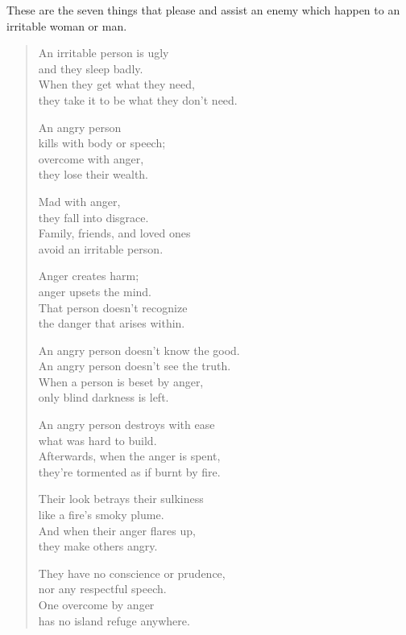 \documentclass[12pt,openany]{book}%
\begin{document}
These are the seven things that please and assist an enemy which happen to an irritable woman or man. 

\begin{verse}%
An irritable person is ugly \\
and they sleep badly. \\
When they get what they need, \\
they take it to be what they don’t need. 

An angry person \\
kills with body or speech; \\
overcome with anger, \\
they lose their wealth. 

Mad with anger, \\
they fall into disgrace. \\
Family, friends, and loved ones \\
avoid an irritable person. 

Anger creates harm; \\
anger upsets the mind. \\
That person doesn’t recognize \\
the danger that arises within. 

An angry person doesn’t know the good. \\
An angry person doesn’t see the truth. \\
When a person is beset by anger, \\
only blind darkness is left. 

An angry person destroys with ease \\
what was hard to build. \\
Afterwards, when the anger is spent, \\
they’re tormented as if burnt by fire. 

Their look betrays their sulkiness \\
like a fire’s smoky plume. \\
And when their anger flares up, \\
they make others angry. 

They have no conscience or prudence, \\
nor any respectful speech. \\
One overcome by anger \\
has no island refuge anywhere. 


\end{verse}
\end{document}
